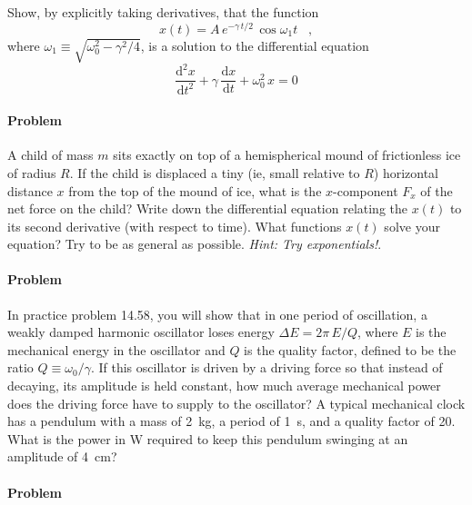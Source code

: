 \documentclass[12pt]{article}
\newcounter{problem}
\begin{document}
Show, by explicitly taking derivatives, that the function
\begin{equation}
x(t) = A\,e^{-\gamma\,t/2}\,\cos\omega_1 t \;\;\; ,
\end{equation}
where $\omega_1\equiv\sqrt{\omega_0^2-\gamma^2/4}$, is a solution
to the differential equation
\begin{equation}
\frac{\mathrm{d}^2x}{\mathrm{d}t^2}
 + \gamma\,\frac{\mathrm{d}x}{\mathrm{d}t}
 + \omega_0^2\,x = 0
\end{equation}

\paragraph{Problem~\theproblem}

A child of mass $m$ sits exactly on top of a hemispherical mound of
frictionless ice of radius $R$.  If the child is displaced a tiny (ie,
small relative to $R$) horizontal distance $x$ from the top of the
mound of ice, what is the $x$-component $F_x$ of the net force on the
child?  Write down the differential equation relating the $x(t)$ to
its second derivative (with respect to time).  What functions $x(t)$
solve your equation?  Try to be as general as possible.  \emph{Hint:
Try exponentials!}.

\paragraph{Problem~\theproblem}

In practice problem 14.58, you will show that in one period of
oscillation, a weakly damped harmonic oscillator loses energy $\Delta
E = 2\pi\,E/Q$, where $E$ is the mechanical energy in the oscillator
and $Q$ is the quality factor, defined to be the ratio
$Q\equiv\omega_0/\gamma$.  If this oscillator is driven by a driving
force so that instead of decaying, its amplitude is held constant, how
much average mechanical power does the driving force have to supply to
the oscillator?  A typical mechanical clock has a pendulum with a mass
of 2~kg, a period of 1~s, and a quality factor of 20.  What is the
power in W required to keep this pendulum swinging at an amplitude of
4~cm?

\paragraph{Problem~\theproblem}
\end{document}
